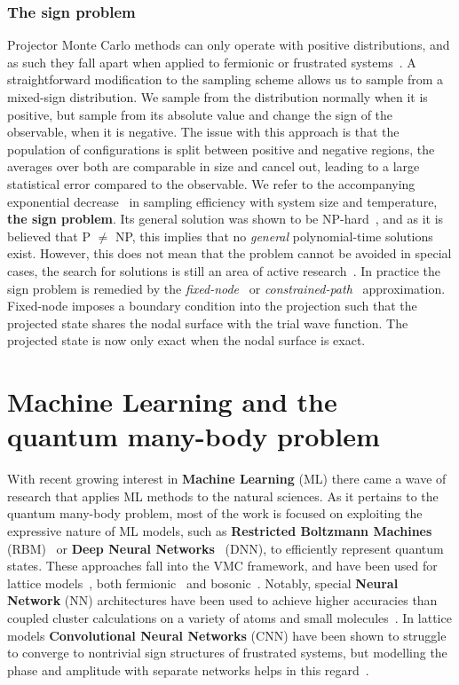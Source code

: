 \subsubsection{The sign problem}
Projector Monte Carlo methods can only operate with positive distributions, and as such they fall apart when applied to fermionic or frustrated systems~\cite{gubernatis_kawashima_werner_2016}. A straightforward modification to the sampling scheme allows us to sample from a mixed-sign distribution. We sample from the distribution normally when it is positive, but sample from its absolute value and change the sign of the observable, when it is negative. The issue with this approach is that the population of configurations is split between positive and negative regions, the averages over both are comparable in size and cancel out, leading to a large statistical error compared to the observable. We refer to the accompanying exponential decrease~\cite{gubernatis_kawashima_werner_2016} in sampling efficiency with system size and temperature, \textbf{the sign problem}. Its general solution was shown to be NP-hard~\cite{troyer2005computational}, and as it is believed that P $\neq$ NP, this implies that no \emph{general} polynomial-time solutions exist. However, this does not mean that the problem cannot be avoided in special cases, the search for solutions is still an area of active research~\cite{hutcheon2020stochastic, assaraf2007fermion, alexandru2020complex}. In practice the sign problem is remedied by the \emph{fixed-node}~\cite{anderson1975random} or \emph{constrained-path}~\cite{zhang1997constrained} approximation. Fixed-node imposes a boundary condition into the projection such that the projected state shares the nodal surface with the trial wave function. The projected state is now only exact when the nodal surface is exact.

\section{Machine Learning and the quantum many-body problem}
With recent growing interest in \textbf{Machine Learning} (ML) there came a wave of research that applies ML methods to the natural sciences. As it pertains to the quantum many-body problem, most of the work is focused on exploiting the expressive nature of ML models, such as \textbf{Restricted Boltzmann Machines} (RBM)~\cite{carleo2017solving} or \textbf{Deep Neural Networks}~\cite{cai2018approximating} (DNN), to efficiently represent quantum states. These approaches fall into the VMC framework, and have been used for lattice models~\cite{carleo2017solving}, both fermionic~\cite{nomura2017restricted} and bosonic~\cite{saito2017solving}. Notably, special \textbf{Neural Network} (NN) architectures have been used to achieve higher accuracies than coupled cluster calculations on a variety of atoms and small molecules~\cite{pfau2020ab, spencer2020better}. In lattice models \textbf{Convolutional Neural Networks} (CNN) have been shown to struggle to converge to nontrivial sign structures of frustrated systems, but modelling the phase and amplitude with separate networks helps in this regard~\cite{szabo2020neural}.

